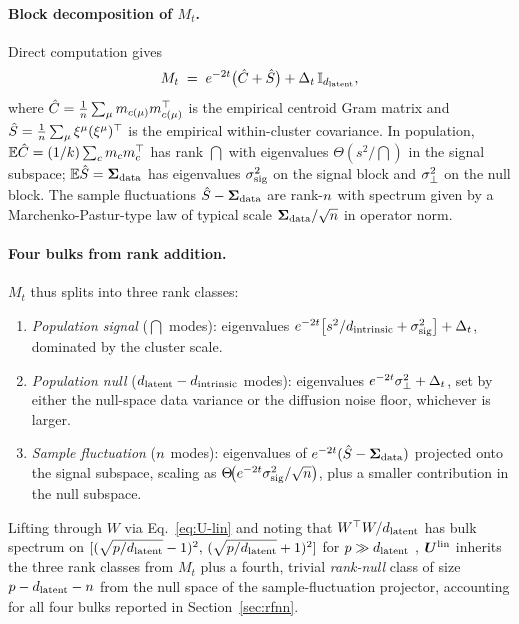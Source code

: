 \paragraph{Block decomposition of $M_t$.}
Direct computation gives
\begin{equation}
  M_t \;=\; e^{-2t}\bigl(\hat C + \hat S\bigr) + \Delta_t\,\mathbb{I}_{d_{\mathrm{latent}}},
  \label{eq:Mt}
\end{equation}
where $\hat C = \tfrac{1}{n}\sum_\mu m_{c(\mu)}m_{c(\mu)}^\top$
is the empirical centroid Gram matrix and $\hat S =
\tfrac{1}{n}\sum_\mu \xi^\mu(\xi^\mu)^\top$ is the empirical
within-cluster covariance. In population,
$\mathbb{E}\hat C = (1/k)\sum_c m_c m_c^\top$ has rank $\dint$ with eigenvalues
$\Theta(s^2/\dint)$ in the signal subspace; $\mathbb{E}\hat S = \bm{\Sigma}_{\mathrm{data}}$
has eigenvalues $\sigma_{\mathrm{sig}}^2$ on the signal block and $\sigma_{\perp}^2$ on
the null block. The sample fluctuations $\hat S - \bm{\Sigma}_{\mathrm{data}}$ are
rank-$n$ with spectrum given by a Marchenko-Pastur-type law
\citep{ELKaroui2010spectrum, couillet2011rmt} of typical scale
$\bm{\Sigma}_{\mathrm{data}}/\sqrt{n}$ in operator norm.

\paragraph{Four bulks from rank addition.}
$M_t$ thus splits into three rank classes:
\begin{enumerate}\itemsep1pt
  \item[\textbf{(a)}] \emph{Population signal} ($\dint$ modes):
        eigenvalues $e^{-2t}\bigl[s^2/d_{\mathrm{intrinsic}} + \sigma_{\mathrm{sig}}^2\bigr] +
        \Delta_t$, dominated by the cluster scale.
  \item[\textbf{(b)}] \emph{Population null} ($d_{\mathrm{latent}} - d_{\mathrm{intrinsic}}$ modes):
        eigenvalues $e^{-2t}\sigma_{\perp}^2 + \Delta_t$, set by either
        the null-space data variance or the diffusion noise floor,
        whichever is larger.
  \item[\textbf{(c)}] \emph{Sample fluctuation} ($n$ modes):
        eigenvalues of $e^{-2t}(\hat S - \bm{\Sigma}_{\mathrm{data}})$ projected onto
        the signal subspace, scaling as
        $\Theta\!\bigl(e^{-2t}\sigma_{\mathrm{sig}}^2/\sqrt{n}\bigr)$, plus a
        smaller contribution in the null subspace.
\end{enumerate}
Lifting through $W$ via Eq.~\eqref{eq:U-lin} and noting that
$W^\top W / d_{\mathrm{latent}}$ has bulk spectrum on $[(\sqrt{p/d_{\mathrm{latent}}} -
1)^2,\,(\sqrt{p/d_{\mathrm{latent}}} + 1)^2]$ for $p \gg d_{\mathrm{latent}}$
\citep{pennington2017nonlinear}, $\bm{U}^{\mathrm{lin}}$ inherits the
three rank classes from $M_t$ plus a fourth, trivial \emph{rank-null}
class of size $p - d_{\mathrm{latent}} - n$ from the null space of the
sample-fluctuation projector, accounting for all four bulks reported
in Section~\ref{sec:rfnn}.

